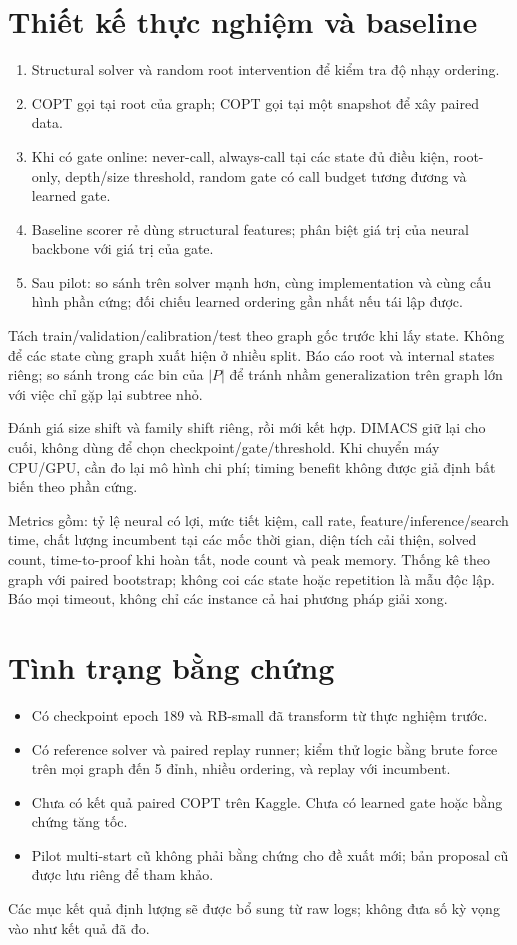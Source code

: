 \documentclass[11pt,a4paper]{article}
\begin{document}
\section{Thiết kế thực nghiệm và baseline}
\begin{enumerate}
\item Structural solver và random root intervention để kiểm tra độ nhạy ordering.
\item COPT gọi tại root của graph; COPT gọi tại một snapshot để xây paired data.
\item Khi có gate online: never-call, always-call tại các state đủ điều kiện, root-only, depth/size threshold, random gate có call budget tương đương và learned gate.
\item Baseline scorer rẻ dùng structural features; phân biệt giá trị của neural backbone với giá trị của gate.
\item Sau pilot: so sánh trên solver mạnh hơn, cùng implementation và cùng cấu hình phần cứng; đối chiếu learned ordering gần nhất nếu tái lập được.
\end{enumerate}

Tách train/validation/calibration/test theo graph gốc trước khi lấy state. Không để các state cùng graph xuất hiện ở nhiều split. Báo cáo root và internal states riêng; so sánh trong các bin của $|P|$ để tránh nhầm generalization trên graph lớn với việc chỉ gặp lại subtree nhỏ.

Đánh giá size shift và family shift riêng, rồi mới kết hợp. DIMACS giữ lại cho cuối, không dùng để chọn checkpoint/gate/threshold. Khi chuyển máy CPU/GPU, cần đo lại mô hình chi phí; timing benefit không được giả định bất biến theo phần cứng.

Metrics gồm: tỷ lệ neural có lợi, mức tiết kiệm, call rate, feature/inference/search time, chất lượng incumbent tại các mốc thời gian, diện tích cải thiện, solved count, time-to-proof khi hoàn tất, node count và peak memory. Thống kê theo graph với paired bootstrap; không coi các state hoặc repetition là mẫu độc lập. Báo mọi timeout, không chỉ các instance cả hai phương pháp giải xong.

\section{Tình trạng bằng chứng}
\begin{itemize}
\item Có checkpoint epoch 189 và RB-small đã transform từ thực nghiệm trước.
\item Có reference solver và paired replay runner; kiểm thử logic bằng brute force trên mọi graph đến 5 đỉnh, nhiều ordering, và replay với incumbent.
\item Chưa có kết quả paired COPT trên Kaggle. Chưa có learned gate hoặc bằng chứng tăng tốc.
\item Pilot multi-start cũ không phải bằng chứng cho đề xuất mới; bản proposal cũ được lưu riêng để tham khảo.
\end{itemize}
Các mục kết quả định lượng sẽ được bổ sung từ raw logs; không đưa số kỳ vọng vào như kết quả đã đo.
\end{document}
